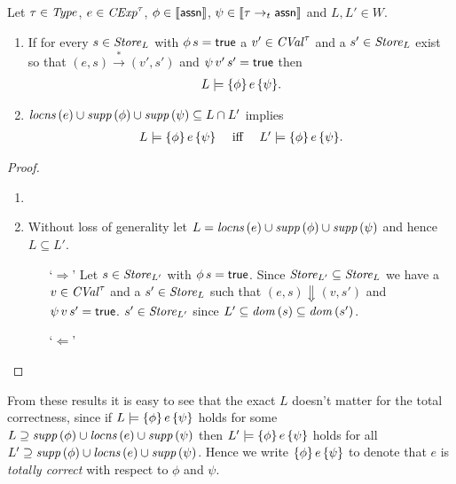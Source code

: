 \documentclass[12pt,a4paper]{report}
\newcommand{\CExp}{\nstyle{CExp}}
\newcommand{\CVal}{\nstyle{CVal}}
\begin{document}
\begin{lemma}
  Let $\tau\in\mathit{Type}$, $e\in\CExp^\tau$, $\phi\in\llbracket\mathsf{assn}\rrbracket$, $\psi\in\llbracket\tau\rightarrow_t\mathsf{assn}\rrbracket$
  and $L,L'\in W$.
  \begin{enumerate}
    \item If for every $s \in \mathit{Store}_L$ with $\phi\,s=\mathsf{true}$ a $v'\in\CVal^\tau$ and a
          $s'\in\mathit{Store}_L$ exist so that $(e,s) \xrightarrow* (v',s')$ and $\psi\,v'\,s'=\mathsf{true}$ then
          \[\begin{array}{rcl}
            L\models\{\phi\}\,e\,\{\psi\}.
          \end{array}\]

    \item $\mathit{locns}\,(e)\cup\mathit{supp}\,(\phi)\cup\mathit{supp}\,(\psi) \subseteq L \cap L'$ implies
          \[\begin{array}{rcl}
            L\models\{\phi\}\,e\,\{\psi\} &\text{ iff }& L'\models\{\phi\}\,e\,\{\psi\}.
          \end{array}\]
  \end{enumerate}
\end{lemma}

\begin{proof} \
  \begin{enumerate}
    \item

    \item Without loss of generality let $L= \mathit{locns}\,(e)\cup\mathit{supp}\,(\phi)\cup\mathit{supp}\,(\psi)$ and hence $L \subseteq L'$.
          \begin{itemize}
            \item[`$\Rightarrow$']
                  Let $s\in\mathit{Store}_{L'}$ with $\phi\,s=\mathsf{true}$. Since $\mathit{Store}_{L'} \subseteq \mathit{Store}_L$ we have
                  a $v\in\CVal^\tau$ and a $s'\in\mathit{Store}_L$ such that $(e,s)\Downarrow(v,s')$ and
                  $\psi\,v\,s'=\mathsf{true}$. $s'\in\mathit{Store}_{L'}$ since $L'\subseteq\mathit{dom}\,(s)\subseteq\mathit{dom}\,(s')$.

            \item[`$\Leftarrow$']
          \end{itemize}
  \end{enumerate}
\end{proof}

From these results it is easy to see that the exact $L$ doesn't matter for the total correctness, since
if $L\models\{\phi\}\,e\,\{\psi\}$ holds for some $L \supseteq \mathit{supp}\,(\phi)\cup\mathit{locns}\,(e)\cup\mathit{supp}\,(\psi)$
then $L'\models\{\phi\}\,e\,\{\psi\}$ holds for all $L'\supseteq \mathit{supp}\,(\phi)\cup\mathit{locns}\,(e)\cup\mathit{supp}\,(\psi)$.
Hence we write $\{\phi\}\,e\,\{\psi\}$ to denote that $e$ is {\em totally correct} with respect to
$\phi$ and $\psi$.
\end{document}
